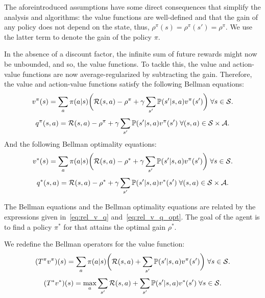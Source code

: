 The aforeintroduced assumptions have some direct consequences that simplify the analysis and algorithms: the value functions are well-defined and that the gain of any policy does not depend on the state, thus, $\rho^\pi(s) = \rho^\pi(s') = \rho^\pi$. We use the latter term to denote the gain of the policy $\pi$.

In the absence of a discount factor, the infinite sum of future rewards might now be unbounded, and so, the value functions. To tackle this, the value and action-value functions are now average-regularized by subtracting the gain. Therefore, the value and action-value functions satisfy the following Bellman equations:
\begin{equation}
  v^\pi(s) = \sum_a \pi(a\lvert s)\bigg(\mathcal{R}(s, a) - \rho^\pi + \gamma \sum_{s'} \mathbb{P}(s'\lvert s, a)v^\pi(s')\bigg)\;\forall s\in\mathcal{S}. 
\end{equation}
\begin{equation}
  q^\pi(s, a) = \mathcal{R}(s, a) - \rho^\pi + \gamma \sum_{s'} \mathbb{P}(s'\lvert s, a)v^\pi(s')\;\forall (s,a)\in\mathcal{S}\times\mathcal{A}. 
\end{equation}
And the following Bellman optimality equations:
\begin{equation}
  v^*(s) = \sum_a \pi(a\lvert s)\bigg(\mathcal{R}(s, a) - \rho^* + \gamma \sum_{s'} \mathbb{P}(s'\lvert s, a)v^\pi(s')\bigg)\;\forall s\in\mathcal{S}. 
\end{equation}
\begin{equation}
  q^*(s, a) = \mathcal{R}(s, a) - \rho^* + \gamma \sum_{s'} \mathbb{P}(s'\lvert s, a)v^*(s')\;\forall (s,a)\in\mathcal{S}\times\mathcal{A}. 
\end{equation}

The Bellman equations and the Bellman optimality equations are related by the expressions given in~\eqref{eq:rel_v_q} and~\eqref{eq:rel_v_q_opt}. The goal of the agent is to find a policy $\pi^*$ for that attains the optimal gain $\rho^*$. 

We redefine the Bellman operators for the value function:
\begin{equation}
  (T^\pi v^\pi)(s) = \sum_a \pi(a\lvert s)\bigg(\mathcal{R}(s, a) + \sum_{s'}  \mathbb{P}(s'\lvert s, a)v^\pi(s')\bigg)\;\forall s\in\mathcal{S}. 
\end{equation}
\begin{equation}
  (T^* v^*)(s) = \max_a \sum_{s'} \mathcal{R}(s, a) + \sum_{s'} \mathbb{P}(s'\lvert s, a)v^*(s')\;\forall s\in\mathcal{S}.
\end{equation}


